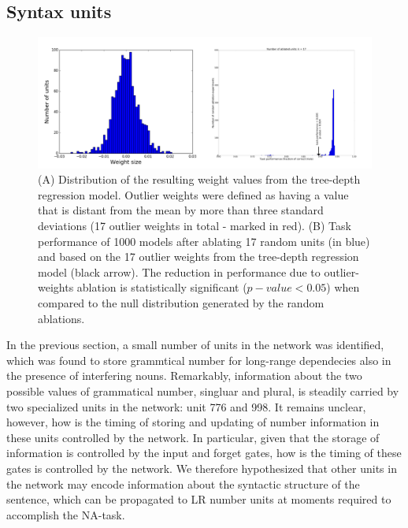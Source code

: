 \subsection{Syntax units}
\begin{figure}[b]
\centering
\includegraphics[width=\linewidth]{Figures/Figure6_regression.png}
\caption{(A) Distribution of the resulting weight values from the tree-depth regression model. Outlier weights were defined as having a value that is distant from the mean by more than three standard deviations (17 outlier weights in total - marked in red). (B) Task performance of 1000 models after ablating 17 random units (in blue) and based on the 17 outlier weights from the tree-depth regression model (black arrow). The reduction in performance due to outlier-weights ablation is statistically significant ($p-value < 0.05$) when compared to the null distribution generated by the random ablations.}
\end{figure}

In the previous section, a small number of units in the network was identified, which was found to store grammtical number for long-range dependecies also in the presence of interfering nouns. Remarkably, information about the two possible values of grammatical number, singluar and plural, is steadily carried by two specialized units in the network: unit 776 and 998. It remains unclear, however, how is the timing of storing and updating of number information in these units controlled by the network. In particular, given that the storage of information is controlled by the input and forget gates, how is the timing of these gates is controlled by the network. We therefore hypothesized that other units in the network may encode information about the syntactic structure of the sentence, which can be propagated to LR number units at moments required to accomplish the NA-task. 

